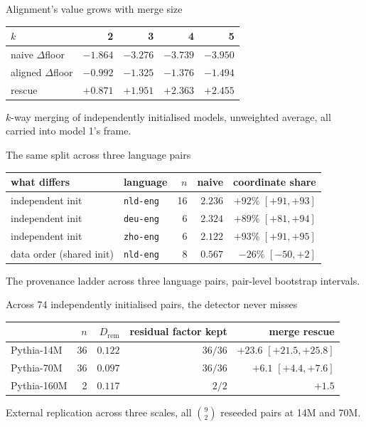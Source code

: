 \documentclass{beamer}
\newcommand{\Drem}{D_{\mathrm{rem}}}
\begin{document}
\begin{frame}{Alignment's value grows with merge size}
  \centering
  \small
  \small
\begin{tabular}{lrrrr}
\toprule
$k$ & 2 & 3 & 4 & 5 \\
\midrule
naive $\Delta$floor   & $-1.864$ & $-3.276$ & $-3.739$ & $-3.950$ \\
aligned $\Delta$floor & $-0.992$ & $-1.325$ & $-1.376$ & $\mathbf{-1.494}$ \\
rescue                & $+0.871$ & $+1.951$ & $+2.363$ & $\mathbf{+2.455}$ \\
\bottomrule
\end{tabular}
  \vspace{0.8em}
  \begin{minipage}{0.92\textwidth}\footnotesize $k$-way merging of independently initialised models, unweighted average, all carried into
model 1's frame.\end{minipage}
\end{frame}

\begin{frame}{The same split across three language pairs}
  \centering
  \small
  \small
\begin{tabular}{llrrr}
\toprule
what differs & language & $n$ & naive & coordinate share \\
\midrule
independent init & \texttt{nld-eng} & 16 & $2.236$ & $+92\%$ $[+91, +93]$ \\
independent init & \texttt{deu-eng} & 6  & $2.324$ & $+89\%$ $[+81, +94]$ \\
independent init & \texttt{zho-eng} & 6  & $2.122$ & $+93\%$ $[+91, +95]$ \\
data order (shared init) & \texttt{nld-eng} & 8 & $0.567$ & $-26\%$ $[-50, +2]$ \\
\bottomrule
\end{tabular}
  \vspace{0.8em}
  \begin{minipage}{0.92\textwidth}\footnotesize The provenance ladder across three language pairs, pair-level bootstrap intervals.\end{minipage}
\end{frame}

\begin{frame}{Across 74 independently initialised pairs, the detector never misses}
  \centering
  \small
  \small
\begin{tabular}{lrrrr}
\toprule
& $n$ & $\Drem$ & residual factor kept & merge rescue \\
\midrule
Pythia-14M  & 36 & $0.122$ & $36/36$ & $+23.6$ $[+21.5, +25.8]$ \\
Pythia-70M  & 36 & $0.097$ & $36/36$ & $+6.1$ $[+4.4, +7.6]$ \\
Pythia-160M & 2  & $0.117$ & $2/2$   & $+1.5$ \\
\bottomrule
\end{tabular}
  \vspace{0.8em}
  \begin{minipage}{0.92\textwidth}\footnotesize External replication across three scales, all $\binom{9}{2}$ reseeded pairs at 14M and 70M.\end{minipage}
\end{frame}
\end{document}

